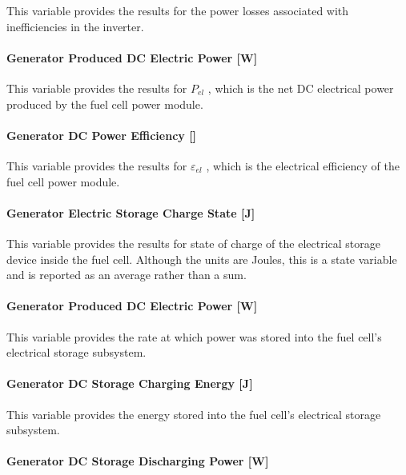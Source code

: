 This variable provides the results for the power losses associated with inefficiencies in the inverter.

\paragraph{Generator Produced DC Electric Power {[}W{]}}\label{generator-produced-dc-electric-power-w}

This variable provides the results for \({P_{el}}\) , which is the net DC electrical power produced by the fuel cell power module.

\paragraph{Generator DC Power Efficiency {[]}}\label{generator-dc-power-efficiency}

This variable provides the results for \({\varepsilon_{el}}\) , which is the electrical efficiency of the fuel cell power module.

\paragraph{Generator Electric Storage Charge State {[}J{]}}\label{generator-electric-storage-charge-state-j}

This variable provides the results for state of charge of the electrical storage device inside the fuel cell. Although the units are Joules, this is a state variable and is reported as an average rather than a sum.

\paragraph{Generator Produced DC Electric Power {[}W{]}}\label{generator-produced-dc-electric-power-w-1}

This variable provides the rate at which power was stored into the fuel cell's electrical storage subsystem.

\paragraph{Generator DC Storage Charging Energy {[}J{]}}\label{generator-dc-storage-charging-energy-j}

This variable provides the energy stored into the fuel cell's electrical storage subsystem.

\paragraph{Generator DC Storage Discharging Power {[}W{]}}\label{generator-dc-storage-discharging-power-w}

